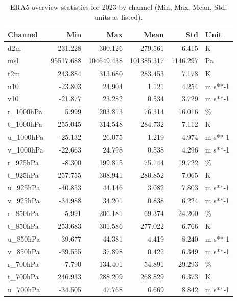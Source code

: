 \begin{table}
\centering
\caption{ERA5 overview statistics for 2023 by channel (Min, Max, Mean, Std; units as listed).}
\label{tab:era5_overview_stats_2023}
\begin{tabular}{lrrrrl}
\toprule
  Channel &       Min &        Max &       Mean &      Std &    Unit \\
\midrule
      d2m &   231.228 &    300.126 &    279.561 &    6.415 &       K \\
      msl & 95517.688 & 104649.438 & 101385.317 & 1146.297 &      Pa \\
      t2m &   243.884 &    313.680 &    283.453 &    7.178 &       K \\
      u10 &   -23.803 &     24.904 &      1.121 &    4.254 & m s**-1 \\
      v10 &   -21.877 &     23.282 &      0.534 &    3.729 & m s**-1 \\
r\_1000hPa &     5.999 &    203.813 &     76.314 &   16.016 &       \% \\
t\_1000hPa &   255.045 &    314.548 &    284.732 &    7.112 &       K \\
u\_1000hPa &   -25.132 &     26.075 &      1.219 &    4.974 & m s**-1 \\
v\_1000hPa &   -22.663 &     24.798 &      0.538 &    4.296 & m s**-1 \\
 r\_925hPa &    -8.300 &    199.815 &     75.144 &   19.722 &       \% \\
 t\_925hPa &   257.755 &    308.941 &    280.852 &    7.065 &       K \\
 u\_925hPa &   -40.853 &     44.146 &      3.082 &    7.803 & m s**-1 \\
 v\_925hPa &   -34.988 &     34.201 &      0.838 &    6.224 & m s**-1 \\
 r\_850hPa &    -5.991 &    206.181 &     69.374 &   24.200 &       \% \\
 t\_850hPa &   253.683 &    301.586 &    277.022 &    6.766 &       K \\
 u\_850hPa &   -39.677 &     44.381 &      4.419 &    8.240 & m s**-1 \\
 v\_850hPa &   -39.555 &     37.898 &      0.422 &    6.349 & m s**-1 \\
 r\_700hPa &    -7.790 &    134.401 &     54.891 &   29.293 &       \% \\
 t\_700hPa &   246.933 &    288.209 &    268.829 &    6.373 &       K \\
 u\_700hPa &   -34.505 &     47.768 &      6.669 &    8.842 & m s**-1 \\

\end{tabular}
\end{table}

